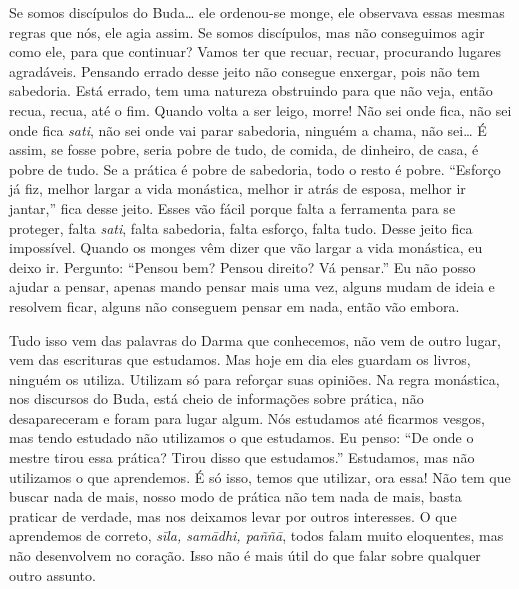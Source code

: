 Se somos discípulos do Buda\ldots{} ele ordenou-se monge, ele observava
essas mesmas regras que nós, ele agia assim. Se somos discípulos, mas
não conseguimos agir como ele, para que continuar? Vamos ter que
recuar, recuar, procurando lugares agradáveis. Pensando errado desse
jeito não consegue enxergar, pois não tem sabedoria. Está errado, tem
uma natureza obstruindo para que não veja, então recua, recua, até o
fim. Quando volta a ser leigo, morre! Não sei onde fica, não sei onde
fica \textit{sati}, não sei onde vai parar sabedoria, ninguém a chama,
não sei\ldots{} É assim, se fosse pobre, seria pobre de tudo, de comida, de
dinheiro, de casa, é pobre de tudo. Se a prática é pobre de sabedoria,
todo o resto é pobre. “Esforço já fiz, melhor largar a vida monástica,
melhor ir atrás de esposa, melhor ir jantar,” fica desse jeito. Esses
vão fácil porque falta a ferramenta para se proteger, falta
\textit{sati}, falta sabedoria, falta esforço, falta tudo. Desse jeito
fica impossível. Quando os monges vêm dizer que vão largar a vida
monástica, eu deixo ir. Pergunto: “Pensou bem? Pensou direito? Vá
pensar.” Eu não posso ajudar a pensar, apenas mando pensar mais uma
vez, alguns mudam de ideia e resolvem ficar, alguns não conseguem
pensar em nada, então vão embora. 

Tudo isso vem das palavras do Darma que conhecemos, não vem de outro
lugar, vem das escrituras que estudamos. Mas hoje em dia eles guardam
os livros, ninguém os utiliza. Utilizam só para reforçar suas opiniões.
Na regra monástica, nos discursos do Buda, está cheio de informações
sobre prática, não desapareceram e foram para lugar algum. Nós
estudamos até ficarmos vesgos, mas tendo estudado não utilizamos o que
estudamos. Eu penso: “De onde o mestre tirou essa prática? Tirou disso
que estudamos.” Estudamos, mas não utilizamos o que aprendemos. É só
isso, temos que utilizar, ora essa! Não tem que buscar nada de mais,
nosso modo de prática não tem nada de mais, basta praticar de verdade,
mas nos deixamos levar por outros interesses. O que aprendemos de
correto, \textit{sīla, samādhi, paññā}, todos falam muito
eloquentes, mas não desenvolvem no coração. Isso não é mais útil do que
falar sobre qualquer outro assunto. 

